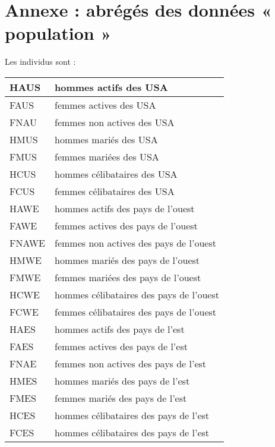 \section{Annexe : abrégés des données « population »}

Les individus sont :
\begin{table}[ht]
\centering
\begin{tabular}{|l|l|}
\hline
HAUS  & hommes actifs des USA                   \\ \hline
FAUS  & femmes actives des USA                  \\ \hline
FNAU  & femmes non actives des USA              \\ \hline
HMUS  & hommes mariés des USA                   \\ \hline
FMUS  & femmes mariées des USA                  \\ \hline
HCUS  & hommes célibataires des USA             \\ \hline
FCUS  & femmes célibataires des USA             \\ \hline
HAWE  & hommes actifs des pays de l'ouest       \\ \hline
FAWE  & femmes actives des pays de l'ouest      \\ \hline
FNAWE & femmes non actives des pays de l'ouest  \\ \hline
HMWE  & hommes mariés des pays de l'ouest       \\ \hline
FMWE  & femmes mariées des pays de l'ouest      \\ \hline
HCWE  & hommes célibataires des pays de l'ouest \\ \hline
FCWE  & femmes célibataires des pays de l'ouest \\ \hline
HAES  & hommes actifs des pays de l'est         \\ \hline
FAES  & femmes actives des pays de l'est        \\ \hline
FNAE  & femmes non actives des pays de l'est    \\ \hline
HMES  & hommes mariés des pays de l'est         \\ \hline
FMES  & femmes mariés des pays de l'est         \\ \hline
HCES  & hommes célibataires des pays de l'est   \\ \hline
FCES  & hommes célibataires des pays de l'est   \\ \hline

\end{tabular}
\end{table}
